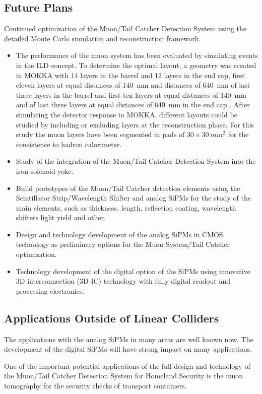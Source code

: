 \subsection{Future Plans}
Continued optimization of the Muon/Tail Catcher Detection System using the detailed Monte Carlo simulation and reconstruction framework.
\begin{itemize}
\item The performance of the muon system has been evaluated by simulating events in the ILD concept. To determine the optimal layout,
a geometry was created in MOKKA with 14 layers in the barrel and 12 layers in the end cap, first eleven layers at equal distances of \SI{140}{mm} and distances of \SI{640}{mm} of last three layers in the barrel and first ten layers at equal distances of \SI{140}{mm} and of last three layers at equal distances of \SI{640}{mm} in the end cap . After simulating the detector response in MOKKA, different layouts could be studied by including or excluding layers at the reconstruction phase. For this study the muon layers have been segmented in pads of $30\times\SI{30}{mm^2}$ for the consistence to hadron calorimeter.
\item Study of the integration of the Muon/Tail Catcher Detection System into the iron solenoid yoke.
\item Build prototypes of the Muon/Tail Catcher detection elements using the Scintillator Strip/Wavelength Shifter and analog SiPMs for the study of the main elements, such as thickness, length, reflection coating, wavelength shifters light yield and other.
\item Design and technology development of the analog SiPMs in CMOS technology as preliminary options for the Muon System/Tail Catcher optimization.
\item Technology development of the digital option of the SiPMs using innovative 3D interconnection (3D-IC) technology with fully digital readout and processing electronics.
\end{itemize}

\subsection{Applications Outside of Linear Colliders}

The applications with the analog SiPMs in many areas are well known now.
The development of the digital SiPMs will have strong impact on many applications.

One of the important potential applications of the full design and technology of the Muon/Tail Catcher Detection System for Homeland Security is the muon tomography for the security checks of transport containers.

